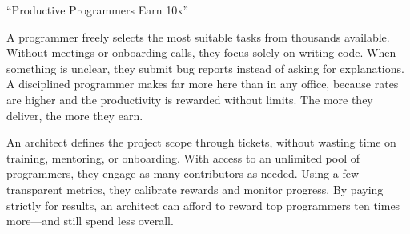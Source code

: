 \documentclass{article}
\newcommand\slide[1]{%
  \pagebreak\topskip0pt\vspace*{\fill}%
  \begin{center}\LARGE%
  #1
  \end{center}%
  \vspace*{\fill}}
\begin{document}
\slide{
  \par
  {\Huge \enquote{Productive Programmers Earn 10x}\par}
  \vspace{1em}
  {\intro\begin{multicols}{2}
  A programmer freely selects the most suitable tasks from thousands available.
  Without meetings or onboarding calls, they focus solely on writing code.
  When something is unclear, they submit bug reports instead of asking for explanations.
  A disciplined programmer makes far more here than in any office, because rates are higher and the productivity is rewarded without limits.
  The more they deliver, the more they earn.
  \par\columnbreak\par
  An architect defines the project scope through tickets, without wasting time on training, mentoring, or onboarding.
  With access to an unlimited pool of programmers, they engage as many contributors as needed.
  Using a few transparent metrics, they calibrate rewards and monitor progress.
  By paying strictly for results, an architect can afford to reward top programmers ten times more---and still spend less overall.
  \end{multicols}\par}}
\end{document}
